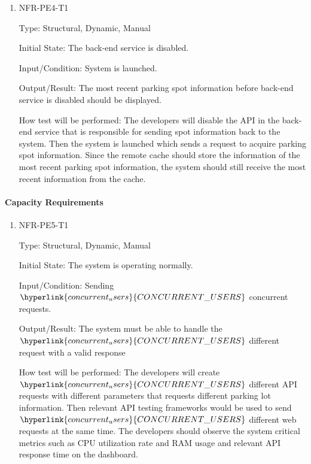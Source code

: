 \documentclass[12pt, titlepage]{article}
\begin{document}
\begin{enumerate}

\item{NFR-PE4-T1}

Type: Structural, Dynamic, Manual
					
Initial State: The back-end service is disabled.
					
Input/Condition: System is launched.
					
Output/Result: The most recent parking spot information before back-end service
is disabled should be displayed.
					
How test will be performed: The developers will disable the API in the back-end
service that is responsible for sending spot information back to the system.
Then the system is launched which sends a request to acquire parking spot
information. Since the remote cache should store the information of the most
recent parking spot information, the system should still receive the most recent
information from the cache.
					
\end{enumerate}

\paragraph{Capacity Requirements}

\begin{enumerate}

\item{NFR-PE5-T1}

Type: Structural, Dynamic, Manual
					
Initial State: The system is operating normally.
					
Input/Condition: Sending $\hyperlink{concurrent_users}{CONCURRENT\_USERS}$
concurrent requests.
					
Output/Result: The system must be able to handle the
$\hyperlink{concurrent_users}{CONCURRENT\_USERS}$ different request with a valid
response
					
How test will be performed: The developers will create
$\hyperlink{concurrent_users}{CONCURRENT\_USERS}$ different API requests with
different parameters that requests different parking lot information. Then
relevant API testing frameworks would be used to send
\\$\hyperlink{concurrent_users}{CONCURRENT\_USERS}$ different web requests at
the same time. The developers should observe the system critical metrics such as
CPU utilization rate and RAM usage and relevant API response time on the
dashboard.
					
\end{enumerate}
\end{document}

